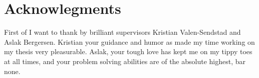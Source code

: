 \section*{Acknowlegments}
First of I want to thank by brilliant supervisors Kristian Valen-Sendstad and Aslak Bergersen. Kristian your guidance and humor as made my time working on my thesis very pleasurable. Aslak, your tough love has kept me on my tippy toes at all times, and your problem solving abilities are of the absolute highest, bar none. 											